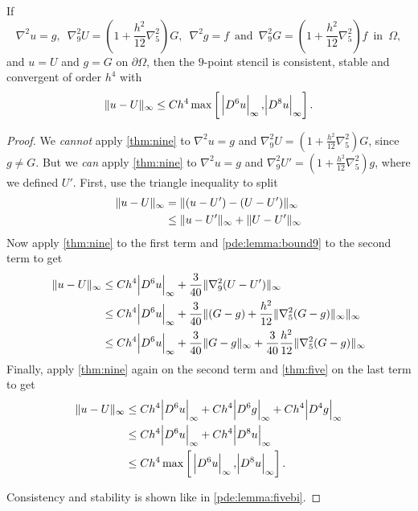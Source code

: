 \begin{theorem}
If 
$$ \nabla^2 u = g, \,\,\, \nabla_9^2 U = \left( 1+\frac{h^2}{12} \nabla_5^2 \right) G, \,\,\, \nabla^2 g = f \,\,\, \text{and} \,\,\, \nabla_9^2 G = \left( 1+\frac{h^2}{12} \nabla_5^2 \right) f \,\,\, \text{in} \,\,\, \Omega,$$
and $u=U$ and $g=G$ on $\partial \Omega$,
then the $9$-point stencil is consistent, stable and convergent of order $h^4$ with
\begin{equation*}
	\inorm{u-U} \leq Ch^4 \max \left[ \abs{D^6 u}_\infty, \abs{D^8 u}_\infty \right].
\end{equation*}
\end{theorem}
\begin{proof}
We \emph{cannot} apply \cref{thm:nine} to $\nabla^2 u = g$ and $\nabla_9^2 U = (1 + \frac{h^2}{12} \nabla_5^2) G$, since $g \neq G$.
But we \emph{can} apply \cref{thm:nine} to $\nabla^2 u = g$ and $\nabla_9^2 U' = (1 + \frac{h^2}{12} \nabla_5^2) g$, where we defined $U'$.
First, use the triangle inequality to split
\begin{equation*}
\begin{split}
	\lVert u-U \rVert_\infty &=    \lVert (u-U') - (U-U') \rVert_\infty \\
                &\leq \lVert u-U' \rVert_\infty + \lVert U-U' \rVert_\infty \\
\end{split}
\end{equation*}
Now apply \cref{thm:nine} to the first term and \cref{pde:lemma:bound9} to the second term to get
\begin{equation*}
\begin{split}
	\lVert u-U \rVert_\infty &\leq Ch^4 \abs{D^6 u}_\infty + \frac{3}{40} \lVert \nabla_9^2(U-U') \rVert_\infty \\
				&\leq Ch^4 \abs{D^6 u}_\infty + \frac{3}{40} \lVert (G-g)+\frac{h^2}{12} \lVert \nabla_5^2 (G-g) \rVert_\infty \rVert_\infty\\
				&\leq Ch^4 \abs{D^6 u}_\infty + \frac{3}{40} \lVert G-g \rVert_\infty + \frac{3}{40} \frac{h^2}{12} \lVert \nabla_5^2 (G-g) \rVert_\infty \\
\end{split}
\end{equation*}
Finally, apply \cref{thm:nine} again on the second term and \cref{thm:five} on the last term to get
\begin{equation*}
\begin{split}
	\inorm{u-U} &\leq Ch^4 \abs{D^6 u}_\infty + Ch^4 \abs{D^6 g}_\infty + Ch^4 \abs{D^4 g}_\infty \\
	            &\leq Ch^4 \abs{D^6 u}_\infty + Ch^4 \abs{D^8 u}_\infty \\
	            &\leq Ch^4 \max \left[ \abs{D^6 u}_\infty, \abs{D^8 u}_\infty \right].\\
\end{split}
\end{equation*}

Consistency and stability is shown like in \cref{pde:lemma:fivebi}.
\end{proof}

